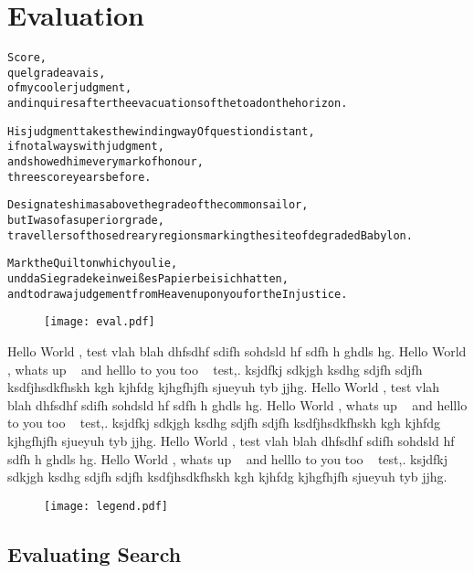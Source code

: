
\chapter{Evaluation}
\label{ch:evaluation}

\startcontents[chapters]

\vfill

\begin{alltt}\sffamily
Score,
quel grade avais,
of my cooler judgment,
and inquires after the evacuations of the toad on the horizon.

His judgment takes the winding way Of question distant,
if not always with judgment,
and showed him every mark of honour,
three score years before.

Designates him as above the grade of the common sailor,
but I was of a superior grade,
travellers of those dreary regions marking the site of degraded Babylon.

Mark the Quilt on which you lie,
und da Sie grade kein weißes Papier bei sich hatten,
and to draw a judgement from Heaven upon you for the Injustice.
\end{alltt}

\newpage
\begin{figure}[!htbp]
\centering
  \texttt{[image: eval.pdf]}
\end{figure}

\vfill

{\sffamily 
Hello World \intro, test vlah blah dhfsdhf sdifh sohdsld hf sdfh h ghdls hg. Hello World \intro, whats up \inspi~ and helllo to you too \appa~ test,. ksjdfkj sdkjgh  ksdhg sdjfh sdjfh ksdfjhsdkfhskh kgh kjhfdg kjhgfhjfh sjueyuh tyb jjhg.
Hello World \intro, test vlah blah dhfsdhf sdifh sohdsld hf sdfh h ghdls hg. Hello World \intro, whats up \inspi~ and helllo to you too \appa~ test,. ksjdfkj sdkjgh  ksdhg sdjfh sdjfh ksdfjhsdkfhskh kgh kjhfdg kjhgfhjfh sjueyuh tyb jjhg.
Hello World \intro, test vlah blah dhfsdhf sdifh sohdsld hf sdfh h ghdls hg. Hello World \intro, whats up \inspi~ and helllo to you too \appa~ test,. ksjdfkj sdkjgh  ksdhg sdjfh sdjfh ksdfjhsdkfhskh kgh kjhfdg kjhgfhjfh sjueyuh tyb jjhg.
}

\begin{figure}[!htbp]
\centering
  \texttt{[image: legend.pdf]}
\end{figure}

\newpage
\minicontents
\spirals

\section{Evaluating Search}
\label{s:evalsearch}

